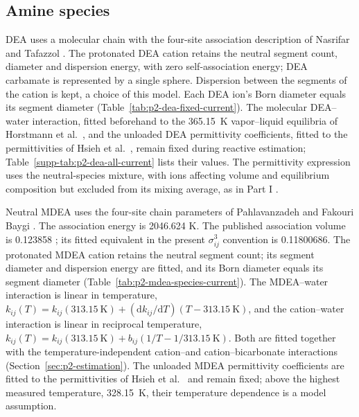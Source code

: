 \subsection{Amine species}\label{sec:p2-species}
DEA uses a molecular chain with the four-site association description of Nasrifar and Tafazzol \cite[Table~2, Sect.~6]{Nasrifar2010}.
The protonated DEA cation retains the neutral segment count, diameter and dispersion energy, with zero self-association energy; DEA carbamate is represented by a single sphere.
Dispersion between the segments of the cation is kept, a choice of this model.
Each DEA ion's Born diameter equals its segment diameter (Table~\ref{tab:p2-dea-fixed-current}).
The molecular DEA--water interaction, fitted beforehand to the 365.15~K vapor--liquid equilibria of Horstmann et al.\ \cite{horstmannPhaseEquilibriumExcess2002}, and the unloaded DEA permittivity coefficients, fitted to the permittivities of Hsieh et al.\ \cite{hsiehDielectricConstantsAqueous2007}, remain fixed during reactive estimation; Table~\ref{supp-tab:p2-dea-all-current} lists their values.
The permittivity expression uses the neutral-species mixture, with ions affecting volume and equilibrium composition but excluded from its mixing average, as in Part I \cite[Sect.~2]{PolleyPartI}.



Neutral MDEA uses the four-site chain parameters of Pahlavanzadeh and Fakouri Baygi \cite[Table~2]{Pahlavanzadeh2013}.
The association energy is 2046.624 K.
The published association volume is 0.123858 \cite[Table~3]{Uyan2015}; its fitted equivalent in the present $\sigma_{ij}^{3}$ convention is 0.11800686.
The protonated MDEA cation retains the neutral segment count; its segment diameter and dispersion energy are fitted, and its Born diameter equals its segment diameter (Table~\ref{tab:p2-mdea-species-current}).
The MDEA--water interaction is linear in temperature, $k_{ij}(T)=k_{ij}(313.15~\mathrm{K})+(\mathrm{d}k_{ij}/\mathrm{d}T)(T-313.15~\mathrm{K})$, and the cation--water interaction is linear in reciprocal temperature, $k_{ij}(T)=k_{ij}(313.15~\mathrm{K})+b_{ij}(1/T-1/313.15~\mathrm{K})$.
Both are fitted together with the temperature-independent cation--\COtwo and cation--bicarbonate interactions (Section~\ref{sec:p2-estimation}).
The unloaded MDEA permittivity coefficients are fitted to the permittivities of Hsieh et al.\ \cite{hsiehDielectricConstantsAqueous2007} and remain fixed; above the highest measured temperature, 328.15~K, their temperature dependence is a model assumption.

